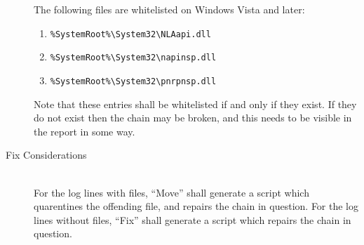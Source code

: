\begin{description}
The following files are whitelisted on Windows Vista and later:
\begin{enumerate}
    \item \verb|%SystemRoot%\System32\NLAapi.dll|
    \item \verb|%SystemRoot%\System32\napinsp.dll|
    \item \verb|%SystemRoot%\System32\pnrpnsp.dll|
\end{enumerate}

Note that these entries shall be whitelisted if and only if they exist. If they
do not exist then the chain may be broken, and this needs to be visible in the
report in some way.
\item[Fix Considerations] \hfill \\
For the log lines with files, ``Move'' shall generate a script which quarentines
the offending file, and repairs the chain in question.
For the log lines without files, ``Fix'' shall generate a script which repairs
the chain in question.
\end{description}

